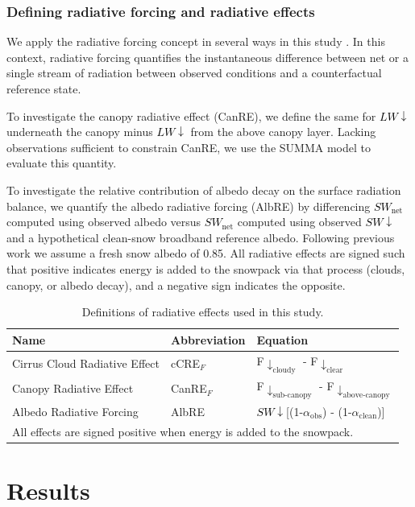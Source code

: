 \documentclass[12pt]{iopjournal}
\newcommand{\lwdn}{\textcolor{black}{$LW\downarrow$}\xspace}
\newcommand{\swnet}{\textcolor{black}{$SW_{\mathrm{net}}$}\xspace}
\newcommand{\swdn}{\textcolor{black}{$SW\downarrow$}\xspace}
\begin{document}
\subsubsection{Defining radiative forcing and radiative effects} 
We apply the radiative forcing concept in several ways in this study \citep{Deems2013-vv, Rudisill2025-cx, Ramanathan1989-pa}. 
In this context, radiative forcing quantifies the instantaneous difference between net or a single stream of radiation between observed conditions and a counterfactual reference state. 


To investigate the canopy radiative effect (CanRE), we define the same for \lwdn underneath the canopy minus \lwdn from the above canopy layer. 
Lacking observations sufficient to constrain CanRE, we use the SUMMA model to evaluate this quantity.

To investigate the relative contribution of albedo decay on the surface radiation balance, we quantify the albedo radiative forcing (AlbRE) by differencing \swnet computed using observed albedo versus \swnet computed using observed \swdn and a hypothetical clean-snow broadband reference albedo. 
Following previous work we assume a fresh snow albedo of 0.85.
All radiative effects are signed such that positive indicates energy is added to the snowpack via that process (clouds, canopy, or albedo decay), and a negative sign indicates the opposite.

\begin{table}[h]
\centering
\caption{Definitions of radiative effects used in this study.}
\label{tab:radiative_effects}
\begin{tabular}{lll}
\hline
\textbf{Name} & \textbf{Abbreviation} & \textbf{Equation} \\
\hline
Cirrus Cloud Radiative Effect  & cCRE$_F$  & F$\downarrow_\text{cloudy}$ - F$\downarrow_\text{clear}$ \\
Canopy Radiative Effect        & CanRE$_F$ & F$\downarrow_\text{sub-canopy}$ - F$\downarrow_\text{above-canopy}$ \\
Albedo Radiative Forcing       & AlbRE     & \swdn[(1-$\alpha_\text{obs}$)  - (1-$\alpha_\text{clean}$)]\\
\hline
\multicolumn{3}{l}{\footnotesize All effects are signed positive when energy is added to the snowpack.} \\
\end{tabular}
\end{table}


\section{Results}
\end{document}

